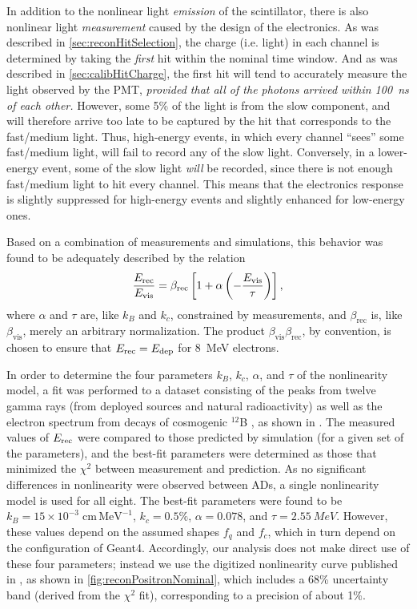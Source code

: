 \documentclass[../thesis.tex]{subfiles}
\begin{document}
In addition to the nonlinear light \emph{emission} of the scintillator, there is also nonlinear light \emph{measurement} caused by the design of the electronics. As was described in \autoref{sec:reconHitSelection}, the charge (i.e. light) in each channel is determined by taking the \emph{first} hit within the nominal time window. And as was described in \autoref{sec:calibHitCharge}, the first hit will tend to accurately measure the light observed by the PMT, \emph{provided that all of the photons arrived within 100~ns of each other.} However, some 5\% of the light is from the slow component, and will therefore arrive too late to be captured by the hit that corresponds to the fast/medium light. Thus, high-energy events, in which every channel ``sees'' some fast/medium light, will fail to record any of the slow light. Conversely, in a lower-energy event, some of the slow light \emph{will} be recorded, since there is not enough fast/medium light to hit every channel. This means that the electronics response is slightly suppressed for high-energy events and slightly enhanced for low-energy ones.

Based on a combination of measurements and simulations, this behavior was found to be adequately described by the relation
\begin{equation}
  \frac{E_\mathrm{rec}}{E_\mathrm{vis}} = \beta_{\mathrm{rec}}\left[ 1 + \alpha \left( - \frac{E_\mathrm{vis}}{\tau} \right) \right],
  \label{eq:reconScintElec}
\end{equation}
where $\alpha$ and $\tau$ are, like $k_B$ and $k_c$, constrained by measurements, and $\beta_{\mathrm{rec}}$ is, like $\beta_{\mathrm{vis}}$, merely an arbitrary normalization. The product $\beta_{\mathrm{vis}}\beta_{\mathrm{rec}}$, by convention, is chosen to ensure that $E_\mathrm{rec} = E_\mathrm{dep}$ for 8~MeV electrons.

In order to determine the four parameters $k_B$, $k_c$, $\alpha$, and $\tau$ of the nonlinearity model, a fit was performed to a dataset consisting of the peaks from twelve gamma rays (from deployed sources and natural radioactivity) as well as the electron spectrum from decays of cosmogenic $^{12}$B \cite{NonlinearityPaper}, as shown in . The measured values of $E_\mathrm{rec}$ were compared to those predicted by simulation (for a given set of the parameters), and the best-fit parameters were determined as those that minimized the $\chi^2$ between measurement and prediction. As no significant differences in nonlinearity were observed between ADs, a single nonlinearity model is used for all eight. The best-fit parameters were found to be $k_B = 15 \times 10^{-3}\;\mathrm{cm\, MeV^{-1}}$, $k_c = 0.5\%$, $\alpha = 0.078$, and $\tau = \SI{2.55}{MeV}$. However, these values depend on the assumed shapes $f_q$ and $f_c$, which in turn depend on the configuration of Geant4. Accordingly, our analysis does not make direct use of these four parameters; instead we use the digitized nonlinearity curve published in \cite{NonlinearityPaper}, as shown in \autoref{fig:reconPositronNominal}, which includes a 68\% uncertainty band (derived from the $\chi^2$ fit), corresponding to a precision of about 1\%.
\end{document}
